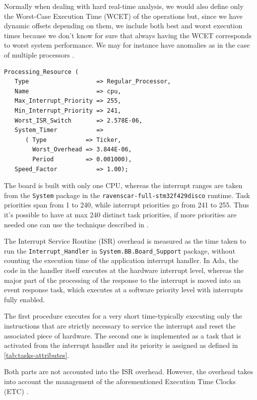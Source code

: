 \documentclass{article}
\begin{document}
Normally when dealing with hard real-time analysis, we would also define only the Worst-Case Execution Time (WCET) of the operations but, since we have dynamic offsets depending on them, we include both best and worst execution times because we don't know for sure that always having the WCET corresponds to worst system performance. We may for instance have anomalies as in the case of multiple processors \cite{anomalies-multiprocessor}.

\begin{lstlisting}
Processing_Resource (
   Type                   => Regular_Processor,
   Name                   => cpu,
   Max_Interrupt_Priority => 255,
   Min_Interrupt_Priority => 241,
   Worst_ISR_Switch       => 2.578E-06,
   System_Timer           =>
      ( Type           => Ticker,
        Worst_Overhead => 3.844E-06,
        Period         => 0.001000),
   Speed_Factor           => 1.00);
\end{lstlisting}

The board is built with only one CPU, whereas the interrupt ranges are taken from the \texttt{System} package in the \texttt{ravenscar-full-stm32f429disco} runtime. Task priorities span from 1 to 240, while interrupt priorities go from 241 to 255. Thus it's possible to have at max 240 distinct task priorities, if more priorities are needed one can use the technique described in \cite{limited-priorities}.

The Interrupt Service Routine (ISR) overhead is measured as the time taken to run the \texttt{Interrupt\_Handler} in \texttt{System.BB.Board\_Support} package, without counting the execution time of the application interrupt handler. In Ada, the code in the handler itself executes at the hardware interrupt level, whereas the major part of the processing of the response to the interrupt is moved into an event response task, which executes at a software priority level with interrupts fully enabled.

The first procedure executes for a very short time-typically executing only the instructions that are strictly necessary to service the interrupt and reset the associated piece of hardware. The second one is implemented as a task that is activated from the interrupt handler and its priority is assigned as defined in \ref{tab:tasks-attributes}.

Both parts are not accounted into the ISR overhead. However, the overhead takes into account the management of the aforementioned Execution Time Clocks (ETC) \cite{etc}.
\end{document}
